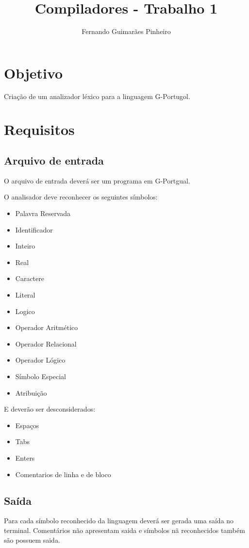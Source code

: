 \documentclass[a4paper,10pt]{article}
\title{Compiladores - Trabalho 1}
\author{Fernando Guimar\~aes Pinheiro}
\begin{document}
\maketitle



\section{Objetivo}
	Cria\c c\~ao de um analizador l\'exico para a linguagem G-Portugol.

\section{Requisitos}

	\subsection{Arquivo de entrada}
		O arquivo de entrada dever\'a ser um programa em G-Portgual.

		O analisador deve reconhecer os seguintes s\'imbolos:
		\begin{itemize}
		\item Palavra Reservada
		\item Identificador
		\item Inteiro
		\item Real
		\item Caractere
		\item Literal
		\item Logico
		\item Operador Aritm\'etico
		\item Operador Relacional
		\item Operador L\'ogico
		\item S\'imbolo Especial
		\item Atribui\c c\~ao
		\end{itemize}

		E dever\~ao ser desconsiderados:
		\begin{itemize}
		 \item Espa\c cos
		 \item Tabs
		 \item Enters
 		 \item Comentarios de linha e de bloco
		\end{itemize}


	\subsection{Sa\'ida}
		Para cada s\'imbolo reconhecido da linguagem dever\'a ser gerada uma sa\'ida no terminal.
		Coment\'arios n\~ao apresentam saida e s\'imbolos n\~a reconhecidos tamb\'em s\~ao possuem saida.
\end{document}
